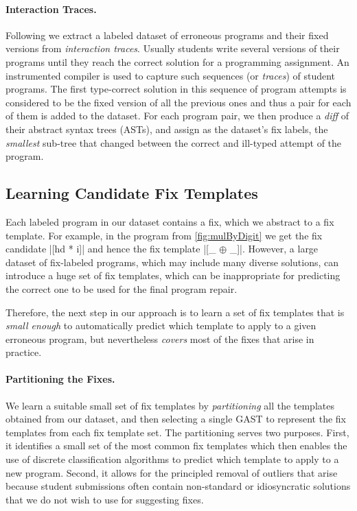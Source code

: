 \paragraph{Interaction Traces.}
Following \citep{Seidel:2017} we extract a labeled dataset of erroneous programs
and their fixed versions from \emph{interaction traces}. Usually students write
several versions of their programs until they reach the correct solution for a
programming assignment. An instrumented compiler is used to capture such
sequences (or \emph{traces}) of student programs. The first type-correct
solution in this sequence of program attempts is considered to be the fixed
version of all the previous ones and thus a pair for each of them is added to
the dataset. For each program pair, we then produce a \emph{diff} of their
abstract syntax trees (ASTs), and assign as the dataset's fix labels, the
\emph{smallest} sub-tree that changed between the correct and ill-typed attempt
of the program.


\subsection{Learning Candidate Fix Templates}
\label{sec:overview:learn}

Each labeled program in our dataset contains a fix, which we abstract to a fix
template. For example, in the \mbd program from \autoref{fig:mulByDigit} we get
the fix candidate |[hd * i]| and hence the fix template |[_ $\oplus$ _]|.
However, a large dataset of fix-labeled programs, which may include many
diverse solutions, can introduce a huge set of fix templates, which can be
inappropriate for predicting the correct one to be used for the final program
repair.

Therefore, the next step in our approach is to learn a set of fix templates
that is \emph{small enough} to automatically predict which template to apply to
a given erroneous program, but nevertheless \emph{covers} most of the fixes that
arise in practice.

\paragraph{Partitioning the Fixes.} We learn a suitable small set of fix
templates by \emph{partitioning} all the templates obtained from our dataset,
and then selecting a single GAST to represent the fix templates from each fix
template set.
%
The partitioning serves two purposes.
%
First, it identifies a small set of the most common fix templates which then
enables the use of discrete classification algorithms to predict which template
to apply to a new program.
%
Second, it allows for the principled removal of outliers that arise because
student submissions often contain non-standard or idiosyncratic solutions that
we do not wish to use for suggesting fixes.

